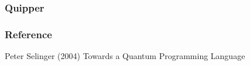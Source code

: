 \documentclass{beamer}
\begin{document}

\begin{frame}
\frametitle{Quipper}

\end{frame}


\begin{frame}
\frametitle{Reference}
\footnotesize{
\begin{thebibliography}{99} %
 Peter Selinger (2004)
\newblock Towards a Quantum Programming Language

\end{thebibliography}
}
\end{frame}

\end{document}
